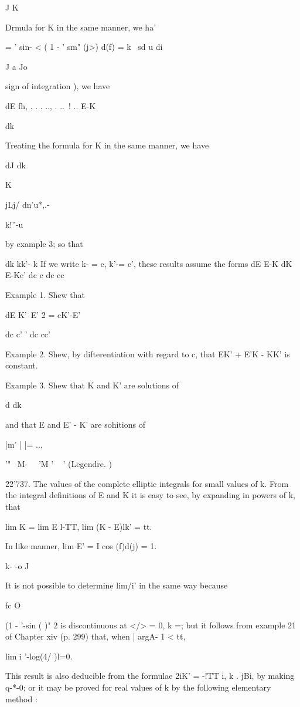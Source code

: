 J K

Drmula for K in the same manner, we ha'

= ' sin- < ( 1 -  ' sm" (j>) d(f) = k \ sd u di

J a Jo

sign of integration  ), we have

dE fh, . . . .., . ..\ ! .. E-K

dk

Treating the formula for K in the same manner, we have

dJ dk

K

jLj/ dn'u*,.-

k!''-u

by example 3; so that

dk kk'- k If we write k- = c, k'-= c', these results assume the forms
dE E-K dK E-Kc' dc c dc cc

Example 1. Shew that

 dE K'~E' 2 = cK'-E'

dc c' ' dc cc'

Example 2. Shew, by difterentiation with regard to c, that EK' + E'K -
KK' is constant.

Example 3. Shew that K and K' are solutions of

d dk

and that E and E' - K' are sohitions of

|m' | |= ..,

 '" ~M- \ \ 'M ' ~ ' (Legendre. )

22'737. The values of the complete elliptic integrals for small values
of k. From the integral definitions of E and K it is easy to see, by
expanding in powers of k, that

lim K = lim E l-TT, lim (K - E)lk' = tt.

In like manner, lim E' = I cos (f)d(j) = 1.

k- -o J

It is not possible to determine lim/i' in the same way because

fc O

(1 - '-sin ( )" 2 is discontinuous at </> = 0, k =; but it follows
from example 21 of Chapter xiv (p. 299) that, when | argA- 1 < tt,

lim i '-log(4/ )l=0.

%
%

This result is also deducible from the formulae 2iK' = -!TT i, k .
jBi, by making q-*-0; or it may be proved for real values of k by the
following elementary method :

